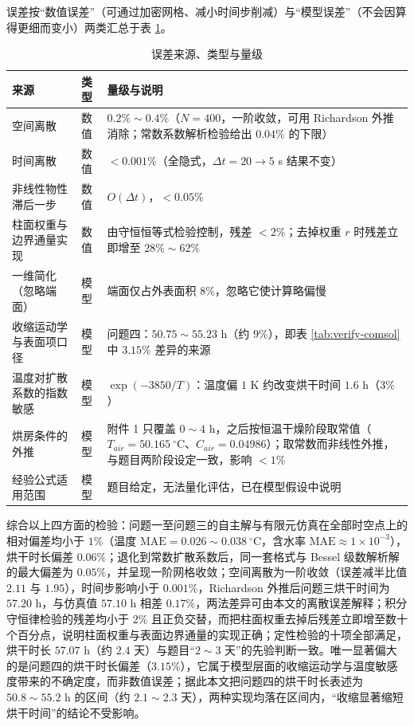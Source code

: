 \documentclass[12pt,a4paper]{article}
\begin{document}
误差按“数值误差”（可通过加密网格、减小时间步削减）与“模型误差”（不会因算得更细而变小）两类汇总于表 \ref{tab:error-source}。

\begin{table}[H]
\centering
\caption{误差来源、类型与量级}
\label{tab:error-source}
\small
\begin{tabular}{p{3.4cm}p{1.6cm}p{9.6cm}}
\toprule
来源 & 类型 & 量级与说明\\
\midrule
空间离散 & 数值 & $0.2\%\sim0.4\%$（$N=400$，一阶收敛，可用 Richardson 外推消除；常数系数解析检验给出 $0.04\%$ 的下限）\\
时间离散 & 数值 & $<0.001\%$（全隐式，$\Delta t=20\to5$ s 结果不变）\\
非线性物性滞后一步 & 数值 & $O(\Delta t)$，$<0.05\%$\\
柱面权重与边界通量实现 & 数值 & 由守恒恒等式检验控制，残差 $<2\%$；去掉权重 $r$ 时残差立即增至 $28\%\sim62\%$\\
一维简化（忽略端面） & 模型 & 端面仅占外表面积 $8\%$，忽略它使计算略偏慢\\
收缩运动学与表面项口径 & 模型 & 问题四：$50.75\sim55.23$ h（约 $9\%$），即表 \ref{tab:verify-comsol} 中 $3.15\%$ 差异的来源\\
温度对扩散系数的指数敏感 & 模型 & $\exp(-3850/T)$：温度偏 $1$ K 约改变烘干时间 $1.6$ h（$3\%$）\\
烘房条件的外推 & 模型 & 附件 1 只覆盖 $0\sim4$ h，之后按恒温干燥阶段取常值（$T_{air}=50.165\ \mathrm{^\circ C}$、$C_{air}=0.04986$）；取常数而非线性外推，与题目两阶段设定一致，影响 $<1\%$\\
经验公式适用范围 & 模型 & 题目给定，无法量化评估，已在模型假设中说明\\
\bottomrule
\end{tabular}
\end{table}

综合以上四方面的检验：问题一至问题三的自主解与有限元仿真在全部时空点上的相对偏差均小于 $1\%$（温度 $\mathrm{MAE}=0.026\sim0.038\ \mathrm{^\circ C}$，含水率 $\mathrm{MAE}\approx1\times10^{-3}$），烘干时长偏差 $0.06\%$；退化到常数扩散系数后，同一套格式与 Bessel 级数解析解的最大偏差为 $0.05\%$，并呈现一阶网格收敛；空间离散为一阶收敛（误差减半比值 $2.11$ 与 $1.95$），时间步影响小于 $0.001\%$，Richardson 外推后问题三烘干时间为 $57.20$ h，与仿真值 $57.10$ h 相差 $0.17\%$，两法差异可由本文的离散误差解释；积分守恒律检验的残差均小于 $2\%$ 且正负交替，而把柱面权重去掉后残差立即增至数十个百分点，说明柱面权重与表面边界通量的实现正确；定性检验的十项全部满足，烘干时长 $57.07$ h（约 $2.4$ 天）与题目“$2\sim3$ 天”的先验判断一致。唯一显著偏大的是问题四的烘干时长偏差（$3.15\%$），它属于模型层面的收缩运动学与温度敏感度带来的不确定度，而非数值误差；据此本文把问题四的烘干时长表述为 $50.8\sim55.2$ h 的区间（约 $2.1\sim2.3$ 天），两种实现均落在区间内，“收缩显著缩短烘干时间”的结论不受影响。
\end{document}
